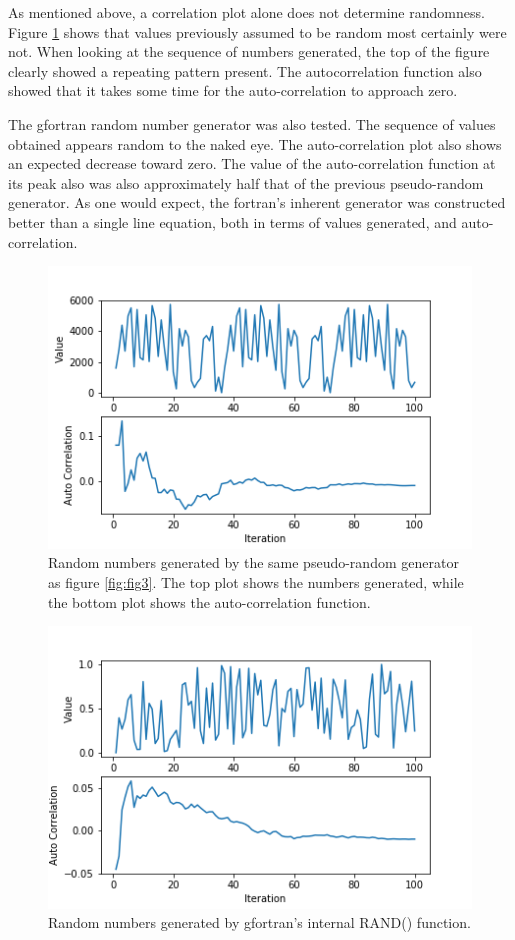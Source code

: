 \documentclass[twocolumn]{article}
\begin{document}
As mentioned above, a correlation plot alone does not determine randomness. Figure \ref{fig:fig4} shows that values previously assumed to be random most certainly were not. When looking at the sequence of numbers generated, the top of the figure clearly showed a repeating pattern present. The autocorrelation function also showed that it takes some time for the auto-correlation to approach zero. 

The gfortran random number generator was also tested. The sequence of values obtained appears random to the naked eye. The auto-correlation plot also shows an expected decrease toward zero. The value of the auto-correlation function at its peak also was also approximately half that of the previous pseudo-random generator. As one would expect, the fortran's inherent generator was constructed better than a single line equation, both in terms of values generated, and auto-correlation.

\begin{figure}[h]
\centering
\includegraphics[width=\linewidth]{fig4}
\caption{Random numbers generated by the same pseudo-random generator as figure \ref{fig:fig3}. The top plot shows the numbers generated, while the bottom plot shows the auto-correlation function.}
\label{fig:fig4}
\end{figure}

\begin{figure}[h]
	\centering
	\includegraphics[width=\linewidth]{fig5}
	\caption{Random numbers generated by gfortran's internal RAND() function.}
	\label{fig:fig5}
\end{figure}
\end{document}
